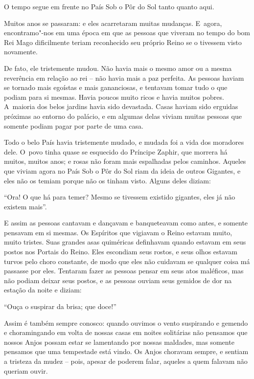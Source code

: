  

O tempo segue em frente no País Sob o Pôr do Sol tanto quanto aqui.

Muitos anos se passaram: e eles acarretaram muitas mudanças. E~agora,
encontramo"-nos em uma época em que as pessoas que viveram no tempo do
bom Rei Mago dificilmente teriam reconhecido seu próprio Reino se o
tivessem visto novamente.

De fato, ele tristemente mudou. Não havia mais o mesmo amor ou a mesma
reverência em relação ao rei -- não havia mais a paz perfeita. As
pessoas haviam se tornado mais egoístas e mais gananciosas, e tentavam
tomar tudo o que podiam para si mesmas. Havia poucos muito ricos e havia
muitos pobres. A~maioria dos belos jardins havia sido devastada. Casas
haviam sido erguidas próximas ao entorno do palácio, e em algumas delas
viviam muitas pessoas que somente podiam pagar por parte de uma casa.

Todo o belo País havia tristemente mudado, e mudada foi a vida dos
moradores dele. O~povo tinha quase se esquecido do Príncipe Zaphir, que
morrera há muitos, muitos anos; e rosas não foram mais espalhadas pelos
caminhos. Aqueles que viviam agora no País Sob o Pôr do Sol riam da
ideia de outros Gigantes, e eles não os temiam porque não os tinham
visto. Alguns deles diziam:

``Ora! O que há para temer? Mesmo se tivessem existido gigantes, eles já
não existem mais''.

E assim as pessoas cantavam e dançavam e banqueteavam como antes, e
somente pensavam em si mesmas. Os Espíritos que vigiavam o Reino estavam
muito, muito tristes. Suas grandes asas quiméricas definhavam quando
estavam em seus postos nos Portais do Reino. Eles escondiam seus rostos,
e seus olhos estavam turvos pelo choro constante, de modo que eles não
cuidavam se qualquer coisa má passasse por eles. Tentaram fazer as
pessoas pensar em seus atos maléficos, mas não podiam deixar seus
postos, e as pessoas ouviam seus gemidos de dor na estação da noite e
diziam:

``Ouça o suspirar da brisa; que doce!''

Assim é também sempre conosco: quando ouvimos o vento suspirando e
gemendo e choramingando em volta de nossas casas em noites solitárias
não pensamos que nossos Anjos possam estar se lamentando por nossas
maldades, mas somente pensamos que uma tempestade está vindo. Os Anjos
choravam sempre, e sentiam a tristeza da mudez -- pois, apesar de
poderem falar, aqueles a quem falavam não queriam ouvir.

